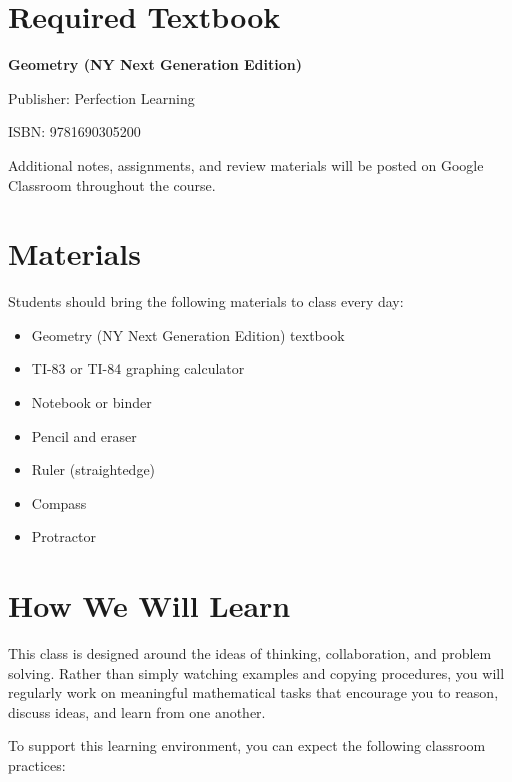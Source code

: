 \documentclass[10pt]{article}
\begin{document}
\section*{Required Textbook}

\textbf{Geometry (NY Next Generation Edition)}

Publisher: Perfection Learning

ISBN: 9781690305200

Additional notes, assignments, and review materials will be posted on Google Classroom throughout the course.

\section*{Materials}

Students should bring the following materials to class every day:

\begin{itemize}
    \item Geometry (NY Next Generation Edition) textbook
    \item TI-83 or TI-84 graphing calculator
    \item Notebook or binder
    \item Pencil and eraser
    \item Ruler (straightedge)
    \item Compass
    \item Protractor
\end{itemize}

\section*{How We Will Learn}

This class is designed around the ideas of thinking, collaboration, and problem solving. Rather than simply watching examples and copying procedures, you will regularly work on meaningful mathematical tasks that encourage you to reason, discuss ideas, and learn from one another.

To support this learning environment, you can expect the following classroom practices:
\end{document}
